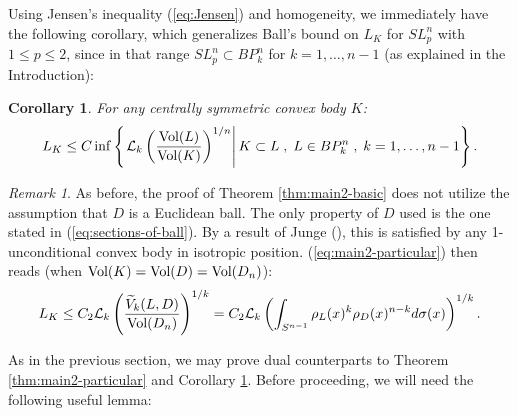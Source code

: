 \documentclass[12pt,oneside]{amsart}
\newtheorem{cor}[thm]{Corollary}
\theoremstyle{definition}
\theoremstyle{remark}
\newtheorem{rem}[thm]{Remark}
\theoremstyle{proof}
\numberwithin{equation}{section}
\newcommand{\set}[1]{\left\{#1\right\}}
\newcommand{\brac}[1]{\left(#1\right)}
\newcommand{\BP}{BP}
\renewcommand{\L}{\mathcal{L}}
\newcommand{\Lk}{\mathcal{L}_k}
\newcommand{\Vol}[1]{\textnormal{Vol} (#1)}
\newcommand{\VolRatio}[2]{\brac{\frac{\Vol{#1}}{\Vol{#2}}}^{1/n}}
\begin{document}
Using Jensen's inequality (\ref{eq:Jensen}) and homogeneity, we
immediately have the following corollary, which generalizes
Ball's bound on $L_K$ for $SL_p^n$ with $1 \leq p \leq 2$, since
in that range $SL_p^n \subset \BP_k^n$ for \mbox{$k=1,\ldots,n-1$}
(as explained in the Introduction):

\begin{cor} \label{cor:main2-particular}
For any centrally symmetric convex body $K$:
\[
L_K \leq C \inf \set{\left . \L_k \VolRatio{L}{K} \right | K
\subset L \; , \; L \in \BP_k^n \; , \; k=1,\ldots,n-1}.
\]
\end{cor}

\begin{rem}
As before, the proof of Theorem \ref{thm:main2-basic} does not
utilize the assumption that $D$ is a Euclidean ball. The only
property of $D$ used is the one stated in
(\ref{eq:sections-of-ball}). By a result of Junge
(\cite{Junge-Unconditional}), this is satisfied by any
1-unconditional convex body in isotropic position.
(\ref{eq:main2-particular}) then reads (when $\Vol{K} = \Vol{D} =
\Vol{D_n}$):
\[
L_K \leq C_2 \Lk
\brac{\frac{\widetilde{V}_{k}(L,D)}{\Vol{D_n}}}^{1/k} = C_2 \Lk
\brac{\int_{S^{n-1}} \rho_L(x)^k \rho_D(x)^{n-k}
d\sigma(x)}^{1/k}.
\]
\end{rem}

\medskip


As in the previous section, we may prove dual counterparts to
Theorem \ref{thm:main2-particular} and Corollary
\ref{cor:main2-particular}. Before proceeding, we will need the
following useful lemma:
\end{document}
